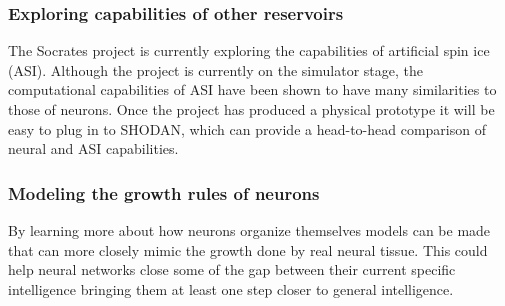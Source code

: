 \subsubsection{Exploring capabilities of other reservoirs}
The Socrates project is currently exploring the capabilities of artificial spin
ice (ASI).
Although the project is currently on the simulator stage, the computational
capabilities of ASI have been shown to have many similarities to those of
neurons.
Once the project has produced a physical prototype it will be easy to plug in to
SHODAN, which can provide a head-to-head comparison of neural and ASI
capabilities.
\subsubsection{Modeling the growth rules of neurons}
By learning more about how neurons organize themselves models can be made that
can more closely mimic the growth done by real neural tissue.
This could help neural networks close some of the gap between their current
specific intelligence bringing them at least one step closer to general
intelligence.
